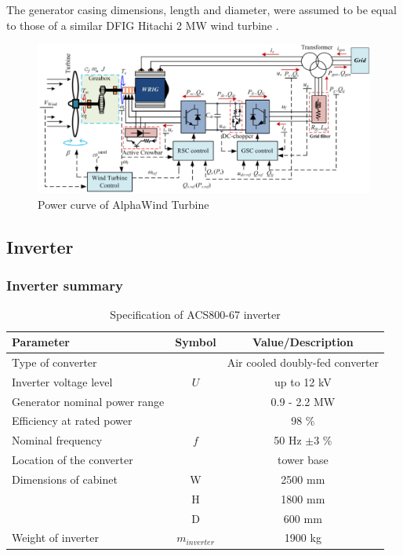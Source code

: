 The generator casing dimensions, length and diameter, were assumed to be equal to those of a similar DFIG Hitachi 2 MW wind turbine \cite{hitachi}.


\begin{figure}[H]
\centering
\includegraphics[width=1\textwidth]{Images/DFIG_figure.png} 
\caption{Power curve of AlphaWind Turbine}
\label{fig:power_curve}
\end{figure}


\newpage
\subsection{Inverter}

\subsubsection{Inverter summary}

\begin{table}[h]
\centering
\caption{Specification of ACS800-67 inverter}
\label{tab:inverter}
\begin{tabular}{ |l|c|c|} 
\hline
\textbf{Parameter} & Symbol & \textbf{Value/Description} \\ 
\hline
Type of converter & & Air cooled doubly-fed converter \\
\hline
Inverter voltage level & $U$ & up to 12 kV\\
\hline
Generator nominal power range & & 0.9 - 2.2 MW \\
\hline
Efficiency at rated power & & 98 \% \\ 
\hline
Nominal frequency & $f$ & 50 Hz $\pm 3$ \% \\
\hline
Location of the converter & & tower base  \\ 
\hline
Dimensions of cabinet & W & 2500 mm \\
\hline
& H & 1800 mm \\
\hline
& D & 600 mm \\
\hline
Weight of inverter & $m_{inverter}$ & 1900 kg \\
\hline
\end{tabular} \\
\end{table}


